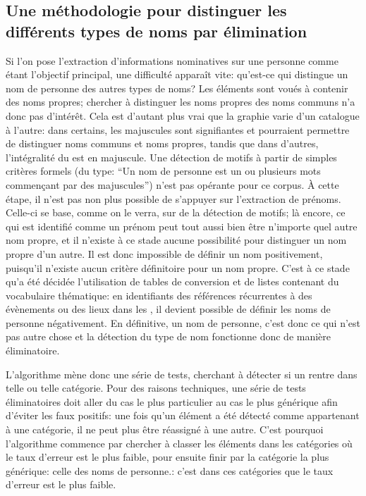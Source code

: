 \subsection{Une méthodologie pour distinguer les différents types de noms par élimination}
Si l'on pose l'extraction d'informations nominatives sur une personne comme étant l'objectif principal, une difficulté apparaît vite: qu'est-ce qui distingue un nom de personne des autres types de noms? Les éléments \tname{} sont voués à contenir des noms propres; chercher à distinguer les noms propres des noms communs n'a donc pas d'intérêt. Cela est d'autant plus vrai que la graphie varie d'un catalogue à l'autre: dans certains, les majuscules sont signifiantes et pourraient permettre de distinguer noms communs et noms propres, tandis que dans d'autres, l'intégralité du \tname{} est en majuscule. Une détection de motifs à partir de simples critères formels (du type: \enquote{Un nom de personne est un ou plusieurs mots commençant par des majuscules}) n'est pas opérante pour ce corpus. À cette étape, il n'est pas non plus possible de s'appuyer sur l'extraction de prénoms. Celle-ci se base, comme on le verra, sur de la détection de motifs; là encore, ce qui est identifié comme un prénom peut tout aussi bien être n'importe quel autre nom propre, et il n'existe à ce stade aucune possibilité pour distinguer un nom propre d'un autre. Il est donc impossible de définir un nom positivement, puisqu'il n'existe aucun critère définitoire pour un nom propre. C'est à ce stade qu'a été décidée l'utilisation de tables de conversion et de listes contenant du vocabulaire thématique: en identifiants des références récurrentes à des évènements ou des lieux dans les \tname{}, il devient possible de définir les noms de personne négativement. En définitive, un nom de personne, c'est donc ce qui n'est pas autre chose et la détection du type de nom fonctionne donc de manière éliminatoire.

L'algorithme mène donc une série de tests, cherchant à détecter si un \tname{} rentre dans telle ou telle catégorie. Pour des raisons techniques, une série de tests éliminatoires doit aller du cas le plus particulier au cas le plus générique afin d'éviter les faux positifs: une fois qu'un élément a été détecté comme appartenant à une catégorie, il ne peut plus être réassigné à une autre. C'est pourquoi l'algorithme commence par chercher à classer les éléments dans les catégories où le taux d'erreur est le plus faible, pour ensuite finir par la catégorie la plus générique: celle des noms de personne.: c'est dans ces catégories que le taux d'erreur est le plus faible. 

